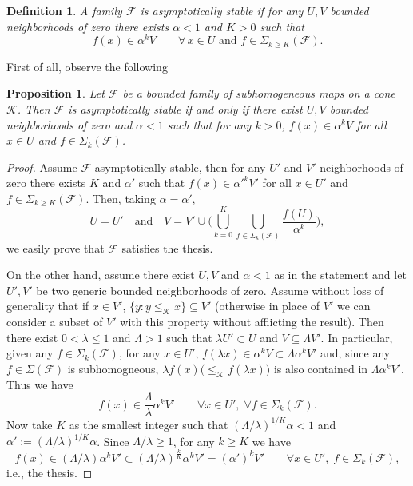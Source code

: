 \documentclass{article}
\newtheorem{definition}[theorem]{Definition}
\newtheorem{proposition}[theorem]{Proposition}
\newcommand{\family}{\mathcal{F}}
\newcommand{\cone}{\mathcal{K}}
\newcommand{\cleq}{\leq_{\cone}}
\begin{document}
\begin{definition}
    A family $\family$ is asymptotically stable if for any $U,V$ bounded neighborhoods of zero there exists $\alpha<1$ and $K>0$ such that 
    $$f(x)\in \alpha^k V \qquad \forall\,  x\in U \text{ and } f\in \Sigma_{k\geq K}(\family).$$
\end{definition}
%
First of all, observe the following 
%
\begin{proposition}
    Let $\family$ be a bounded family of subhomogeneous maps on a cone $\cone$. Then $\family$ is asymptotically stable if and only if there exist $U,V$ bounded neighborhoods of zero and $\alpha<1$ such that for any $k>0$, $f(x)\in \alpha^k V$ for all $x\in U$ and $f\in \Sigma_k(\family)$.
\end{proposition}
\begin{proof}
    Assume $\family$ asymptotically stable, then for any $U'$ and $V'$ neighborhoods of zero there exists $K$ and $\alpha'$ such that 
    $f(x)\in \alpha'^k V'$ for all $x\in U'$ and $f\in \Sigma_{k\geq K}(\family)$. Then, taking $\alpha=\alpha'$,
    \begin{equation}
        U=U' \quad \text{and} \quad V=V'\cup\Big(\bigcup_{k=0}^K\bigcup_{f\in \Sigma_k(\family)}\frac{f(U)}{\alpha^k} \Big),
    \end{equation}
    we easily prove that $\family$ satisfies the thesis.
    
    On the other hand, assume there exist $U, V$ and $\alpha<1$ as in the statement and let $U', V'$ be two generic bounded neighborhoods of zero. Assume without loss of generality that if $x\in V'$, $\{y:y\cleq x\}\subseteq V'$ (otherwise in place of $V'$ we can consider a subset of $V'$ with this property without afflicting the result).
    Then there exist $0<\lambda\leq 1$ and $\Lambda>1$ such that $\lambda U'\subset U$ and $V\subseteq \Lambda V'$. 
    In particular, given any $f\in \Sigma_k(\family)$, for any $x\in U'$, $f(\lambda x)\in \alpha^k V \subset \Lambda \alpha^k V'$ and, since any $f\in \Sigma(\family)$ is subhomogneous, $\lambda f(x) \big(\cleq f(\lambda x)\big)$ is also contained in $\Lambda \alpha^k V'$. Thus we have
    \begin{equation}
    f(x)\in \frac{\Lambda}{\lambda}\alpha^k V' \qquad \forall x\in U', \;\forall f\in \Sigma_k(\family).       
    \end{equation}
    Now take $K$ as the smallest integer such that $(\Lambda/\lambda)^{1/K}\alpha <1$ and $\alpha':=(\Lambda/\lambda)^{1/K}\alpha$. Since $\Lambda/\lambda\geq 1$, for any $k\geq K$ we have 
    \begin{equation}
     f(x)\in (\Lambda/\lambda) \alpha^k V'\subset (\Lambda/\lambda)^{\frac{k}{K}}\alpha^k V'=(\alpha')^k V' \qquad \forall x\in U',\; f\in \Sigma_k(\family),
    \end{equation}
    i.e., the thesis.
\end{proof}
\end{document}
